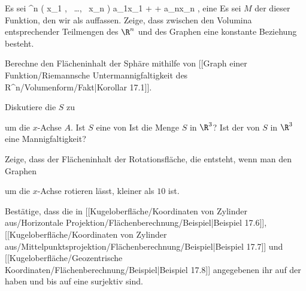 \setcounter{section}{17}


{}
{

Es sei
\maabbeledisp {\varphi} {\R^n } {\R
} { \left(  x_1   , \,   \ldots  , \,   x_n                 \right) } {a_1x_1 + \cdots + a_nx_n
} {,}
eine
Es sei $M$ der
dieser Funktion, den wir als
auffassen. Zeige, dass zwischen den Volumina entsprechender Teilmengen des $\R^n$ und des Graphen eine konstante Beziehung besteht.

}
{} {}

{}
{

Berechne den Flächeninhalt der Sphäre mithilfe von
[[Graph einer Funktion/Riemannsche Untermannigfaltigkeit des R^n/Volumenform/Fakt|Korollar 17.1]].

}
{} {}

{}
{

Diskutiere die
 $S$ zu

 {  }

um die $x$-Achse $A$. Ist $S$ eine
 von
 Ist die Menge $S$
 in $\R^3$? Ist der
 von $S$ in $\R^3$ eine Mannigfaltigkeit?

}
{} {}

{}
{

Zeige, dass der Flächeninhalt der Rotationsfläche, die entsteht, wenn man den Graphen

 {  }

um die $x$-Achse rotieren lässt, kleiner als $10$ ist.

}
{} {}

{}
{

Bestätige, dass die in
[[Kugeloberfläche/Koordinaten von Zylinder aus/Horizontale Projektion/Flächenberechnung/Beispiel|Beispiel 17.6]],
[[Kugeloberfläche/Koordinaten von Zylinder aus/Mittelpunktsprojektion/Flächenberechnung/Beispiel|Beispiel 17.7]]
und
[[Kugeloberfläche/Geozentrische Koordinaten/Flächenberechnung/Beispiel|Beispiel 17.8]]
angegebenen
ihr
auf der
haben und bis auf eine
surjektiv sind.

}
{} {}


